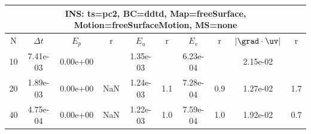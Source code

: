 
\begin{tabular}{|c|c|c|c|c|c|c|c|c|c|} \hline
 \multicolumn{10}{|c|}{INS: ts=pc2, BC=ddtd, Map=freeSurface, Motion=freeSurfaceMotion, MS=none } \\ \hline 
     N  &   $\Delta t$ & $E_p$   &  r  &   $E_u$   &   r    &   $E_v$   & r   &  $|\grad\cdot\uv|$  & r   \\ \hline 
  10   &  7.41e-03  &   0.00e+00  &        &   1.35e-03  &        &   6.23e-04  &        &   2.15e-02  &        \\ 
  20   &  1.89e-03  &   0.00e+00  & NaN  &   1.24e-03  & 1.1  &   7.28e-04  & 0.9  &   1.27e-02  & 1.7  \\ 
  40   &  4.75e-04  &   0.00e+00  & NaN  &   1.22e-03  & 1.0  &   7.59e-04  & 1.0  &   1.92e-02  & 0.7  \\ 
 \hline 
\end{tabular}
